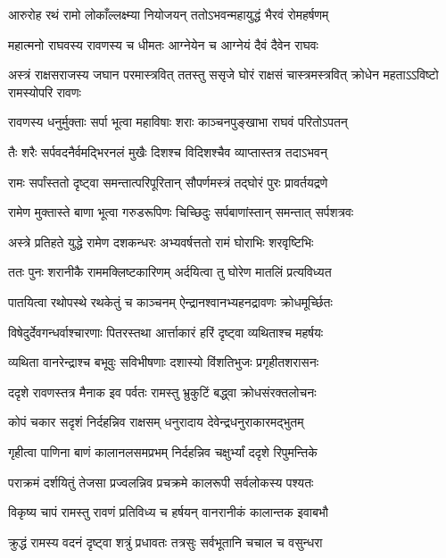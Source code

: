 \twolineshloka
{आरुरोह रथं रामो लोकाँल्लक्ष्म्या नियोजयन्}
{ततोऽभवन्महायुद्धं भैरवं रोमहर्षणम्} %

\twolineshloka
{महात्मनो राघवस्य रावणस्य च धीमतः}
{आग्नेयेन च आग्नेयं दैवं दैवेन राघवः} %

\threelineshloka
{अस्त्रं राक्षसराजस्य जघान परमास्त्रवित्}
{ततस्तु ससृजे घोरं राक्षसं चास्त्रमस्त्रवित्}
{क्रोधेन महताऽऽविष्टो रामस्योपरि रावणः} %

\twolineshloka
{रावणस्य धनुर्मुक्ताः सर्पा भूत्वा महाविषाः}
{शराः काञ्चनपुङ्खाभा राघवं परितोऽपतन्} %

\twolineshloka
{तैः शरैः सर्पवदनैर्वमद्भिरनलं मुखैः}
{दिशश्च विदिशश्चैव व्याप्तास्तत्र तदाऽभवन्} %

\twolineshloka
{रामः सर्पांस्ततो दृष्ट्वा समन्तात्परिपूरितान्}
{सौपर्णमस्त्रं तद्\mbox{}घोरं पुरः प्रावर्तयद्रणे} %

\twolineshloka
{रामेण मुक्तास्ते बाणा भूत्वा गरुडरूपिणः}
{चिच्छिदुः सर्पबाणांस्तान् समन्तात् सर्पशत्रवः} %

\twolineshloka
{अस्त्रे प्रतिहते युद्धे रामेण दशकन्धरः}
{अभ्यवर्षत्ततो रामं घोराभिः शरवृष्टिभिः} %

\twolineshloka
{ततः पुनः शरानीकै राममक्लिष्टकारिणम्}
{अर्दयित्वा तु घोरेण मातलिं प्रत्यविध्यत} %

\twolineshloka
{पातयित्वा रथोपस्थे रथकेतुं च काञ्चनम्}
{ऐन्द्रानश्वानभ्यहनद्रावणः क्रोधमूर्च्छितः} %

\twolineshloka
{विषेदुर्देवगन्धर्वाश्चारणाः पितरस्तथा}
{आर्त्ताकारं हरिं दृष्ट्वा व्यथिताश्च महर्षयः} %

\twolineshloka
{व्यथिता वानरेन्द्राश्च बभूवुः सविभीषणाः}
{दशास्यो विंशतिभुजः प्रगृहीतशरासनः} %

\twolineshloka
{ददृशे रावणस्तत्र मैनाक इव पर्वतः}
{रामस्तु भ्रुकुटिं बद्ध्वा क्रोधसंरक्तलोचनः} %

\twolineshloka
{कोपं चकार सदृशं निर्दहन्निव राक्षसम्}
{धनुरादाय देवेन्द्रधनुराकारमद्भुतम्} %

\twolineshloka
{गृहीत्वा पाणिना बाणं कालानलसमप्रभम्}
{निर्दहन्निव चक्षुर्भ्यां ददृशे रिपुमन्तिके} %

\twolineshloka
{पराक्रमं दर्शयितुं तेजसा प्रज्वलन्निव}
{प्रचक्रमे कालरूपी सर्वलोकस्य पश्यतः} %

\twolineshloka
{विकृष्य चापं रामस्तु रावणं प्रतिविध्य च}
{हर्षयन् वानरानीकं कालान्तक इवाबभौ} %

\twolineshloka
{क्रुद्धं रामस्य वदनं दृष्ट्वा शत्रुं प्रधावतः}
{तत्रसुः सर्वभूतानि चचाल च वसुन्धरा} %

